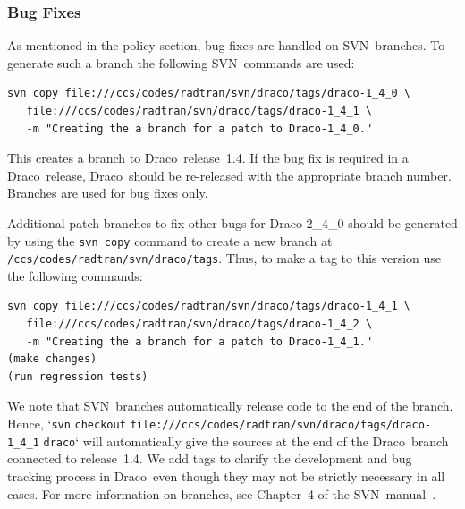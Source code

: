 \documentclass[note]{ResearchNote_pdf}
\newcommand{\draco}{{\normalfont\small\sffamily Draco}}
\newcommand{\cvs}{\textsf{CVS}}
\newcommand{\svn}{\textsf{SVN}}
\begin{document}

\subsubsection{Bug Fixes}

As mentioned in the policy section, bug fixes are handled on
\svn\ branches.  To generate such a branch the following
\svn\ commands are used:
\begin{lstlisting}[basicstyle=\footnotesize, xleftmargin=1.0in, 
  xrightmargin=1.0in]
svn copy file:///ccs/codes/radtran/svn/draco/tags/draco-1_4_0 \
   file:///ccs/codes/radtran/svn/draco/tags/draco-1_4_1 \
   -m "Creating the a branch for a patch to Draco-1_4_0."
\end{lstlisting}
This creates a branch to \draco\ release~1.4.  If the bug fix is
required in a \draco\ release, \draco\ should be re-released with the
appropriate branch number.  Branches are used for bug fixes only.

Additional patch branches to fix other bugs for \draco-2\_4\_0 should
be generated by using the \texttt{svn copy} command to create a new
branch at \texttt{/ccs/codes/radtran/svn/draco/tags}.  Thus, to
make a tag to this version use the following commands:
\begin{lstlisting}[basicstyle=\footnotesize, xleftmargin=1.0in, 
  xrightmargin=1.0in]
svn copy file:///ccs/codes/radtran/svn/draco/tags/draco-1_4_1 \
   file:///ccs/codes/radtran/svn/draco/tags/draco-1_4_2 \
   -m "Creating the a branch for a patch to Draco-1_4_1."
(make changes)
(run regression tests)
\end{lstlisting}
We note that \svn\ branches automatically release code to the end of
the branch.  Hence, `\texttt{svn} \texttt{checkout} \texttt{file:\-///ccs/\-codes/\-radtran\-/svn/draco/tags/draco-1\_4\_1} \texttt{draco}` will
automatically give the sources at the end of the \draco\ branch
connected to release~1.4.  We add tags to clarify the development and
bug tracking process in \draco\ even though they may not be strictly
necessary in all cases.  For more information on branches, see
Chapter~4 of the \svn\ manual~\cite{svn-redbean}.
\end{document}

